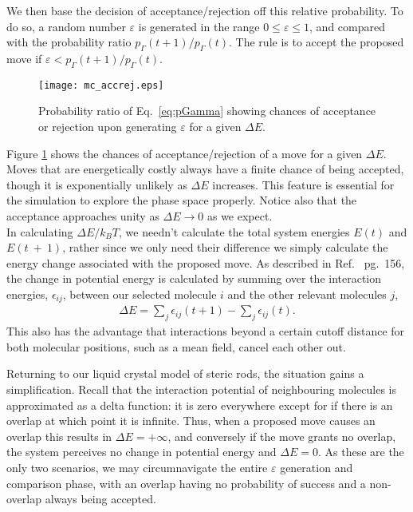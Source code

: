 We then base the decision of acceptance/rejection off this relative probability. To do so, a random number $\varepsilon$ is generated in the range $0\leq \varepsilon \leq 1$, and compared with the probability ratio $p_\Gamma(t+1)/p_\Gamma(t)$. The rule is to accept the proposed move if $\varepsilon < p_\Gamma(t+1)/p_\Gamma(t)$. 

\begin{figure}
	\centering
	\texttt{[image: mc\_accrej.eps]}
	\caption{Probability ratio of Eq.\ \ref{eq:pGamma} showing chances of acceptance or rejection upon generating $\varepsilon$ for a given $\Delta E$.}
	\label{fig:accrej}
\end{figure}

Figure \ref{fig:accrej} shows the chances of acceptance/rejection of a move for a given $\Delta E$. Moves that are energetically costly always have a finite chance of being accepted, though it is exponentially unlikely as $\Delta E$ increases. This feature is essential for the simulation to explore the phase space properly. Notice also that the acceptance approaches unity as $\Delta E \rightarrow 0$ as we expect.\\

In calculating $\Delta E/k_BT$, we needn't calculate the total system energies $E(t)$ and $E(t~+~1)$, rather since we only need their difference we simply calculate the energy change associated with the proposed move. As described in Ref.\ \cite{allenbook} pg.\ 156, the change in potential energy is calculated by summing over the interaction energies, $\epsilon_{ij}$, between our selected molecule $i$ and the other relevant molecules $j$,
\begin{align}
	\Delta E = \sum_j \epsilon_{ij}(t+1) - \sum_j \epsilon_{ij}(t).
\end{align}
This also has the advantage that interactions beyond a certain cutoff distance for both molecular positions, such as a mean field, cancel each other out.

Returning to our liquid crystal model of steric rods, the situation gains a simplification. Recall that the interaction potential of neighbouring molecules is approximated as a delta function: it is zero everywhere except for if there is an overlap at which point it is infinite. Thus, when a proposed move causes an overlap this results in $\Delta E = +\infty$, and conversely if the move grants no overlap, the system perceives no change in potential energy and $\Delta E = 0$. As these are the only two scenarios, we may circumnavigate the entire $\varepsilon$ generation and comparison phase, with an overlap having no probability of success and a non-overlap always being accepted.

